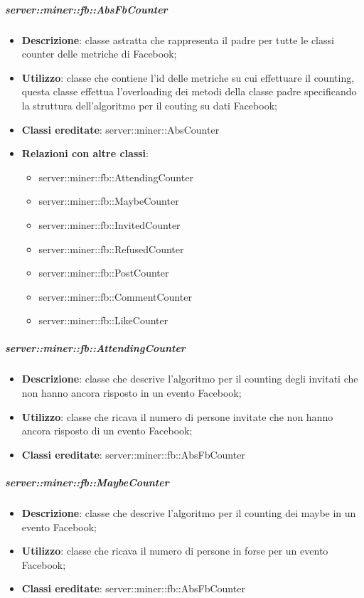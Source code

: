 		\subparagraph{server::miner::fb::AbsFbCounter} %
		\label{subp:server_miner_fb_AbsFbCounter}
			\begin{itemize}
				\item \textbf{Descrizione}: classe astratta che rappresenta il padre per tutte le classi counter delle metriche di Facebook;
				\item \textbf{Utilizzo}: classe che contiene l'id delle metriche su cui effettuare il counting, questa classe effettua l'overloading dei metodi della classe padre specificando la struttura dell'algoritmo per il couting su dati Facebook;
				\item \textbf{Classi ereditate}: server::miner::AbsCounter
				\item \textbf{Relazioni con altre classi}:
					\begin{itemize}
						\item server::miner::fb::AttendingCounter
						\item server::miner::fb::MaybeCounter
						\item server::miner::fb::InvitedCounter
						\item server::miner::fb::RefusedCounter
						\item server::miner::fb::PostCounter
						\item server::miner::fb::CommentCounter
						\item server::miner::fb::LikeCounter
					\end{itemize}
			\end{itemize}

		\subparagraph{server::miner::fb::AttendingCounter} %
		\label{subp:server_miner_fb_AttendingCounter}
			\begin{itemize}
				\item \textbf{Descrizione}: classe che descrive l'algoritmo per il counting degli invitati che non hanno ancora risposto in un evento Facebook;
				\item \textbf{Utilizzo}: classe che ricava il numero di persone invitate che non hanno ancora risposto di un evento Facebook;
				\item \textbf{Classi ereditate}: server::miner::fb::AbsFbCounter
			\end{itemize}

		\subparagraph{server::miner::fb::MaybeCounter} %
		\label{subp:server_miner_fb_MaybeCounter}
			\begin{itemize}
				\item \textbf{Descrizione}: classe che descrive l'algoritmo per il counting dei maybe in un evento Facebook;
				\item \textbf{Utilizzo}: classe che ricava il numero di persone in forse per un evento Facebook;
				\item \textbf{Classi ereditate}: server::miner::fb::AbsFbCounter
			\end{itemize}

